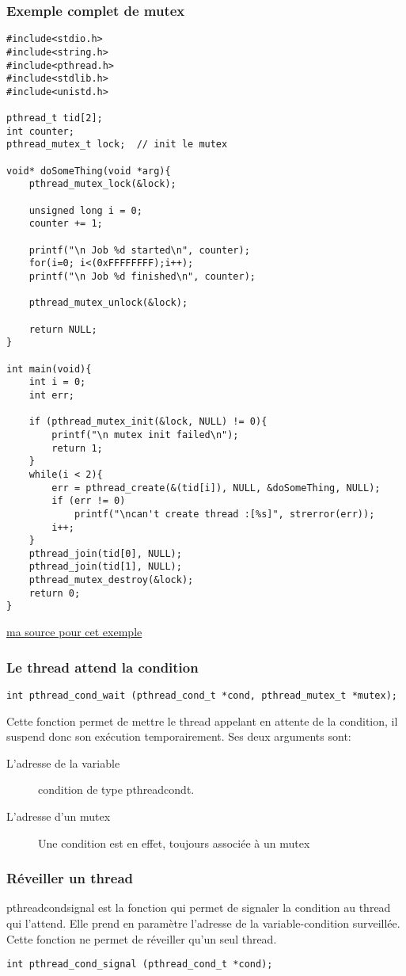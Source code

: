 \documentclass[a4paper]{article}
\begin{document}
\subsubsection{Exemple complet de mutex}
\begin{lstlisting}
#include<stdio.h>
#include<string.h>
#include<pthread.h>
#include<stdlib.h>
#include<unistd.h>

pthread_t tid[2];
int counter;
pthread_mutex_t lock;  // init le mutex

void* doSomeThing(void *arg){
    pthread_mutex_lock(&lock);

    unsigned long i = 0;
    counter += 1;

    printf("\n Job %d started\n", counter);
    for(i=0; i<(0xFFFFFFFF);i++);
    printf("\n Job %d finished\n", counter);

    pthread_mutex_unlock(&lock);

    return NULL;
}

int main(void){
    int i = 0;
    int err;

    if (pthread_mutex_init(&lock, NULL) != 0){
        printf("\n mutex init failed\n");
        return 1;
    }
    while(i < 2){
        err = pthread_create(&(tid[i]), NULL, &doSomeThing, NULL);
        if (err != 0)
            printf("\ncan't create thread :[%s]", strerror(err));
        i++;
    }
    pthread_join(tid[0], NULL);
    pthread_join(tid[1], NULL);
    pthread_mutex_destroy(&lock);
    return 0;
}
\end{lstlisting}
\href{https://www.thegeekstuff.com/2012/05/c-mutex-examples/}{ma source pour cet exemple}
\newpage
\subsubsection{Le thread attend la condition}
\begin{lstlisting}
int pthread_cond_wait (pthread_cond_t *cond, pthread_mutex_t *mutex);
\end{lstlisting}
Cette fonction permet de mettre le thread appelant en attente de la condition, il suspend donc son exécution temporairement. Ses deux arguments sont:
\begin{description}
  \item [L'adresse de la variable] condition de type pthread\textunderscore{}cond\textunderscore{}t.
  \item [L'adresse d'un mutex] Une condition est en effet, toujours associée à un mutex
\end{description}
\subsubsection{Réveiller un thread}
pthread\textunderscore{}cond\textunderscore{}signal est la fonction qui permet de signaler la condition au thread qui l'attend. Elle prend en paramètre l'adresse de la variable-condition surveillée. Cette fonction ne permet de réveiller qu'un seul thread.
\begin{lstlisting}
int pthread_cond_signal (pthread_cond_t *cond);
\end{lstlisting}
\end{document}
